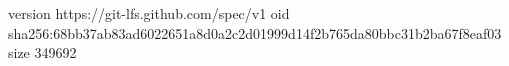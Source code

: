 version https://git-lfs.github.com/spec/v1
oid sha256:68bb37ab83ad6022651a8d0a2c2d01999d14f2b765da80bbc31b2ba67f8eaf03
size 349692

